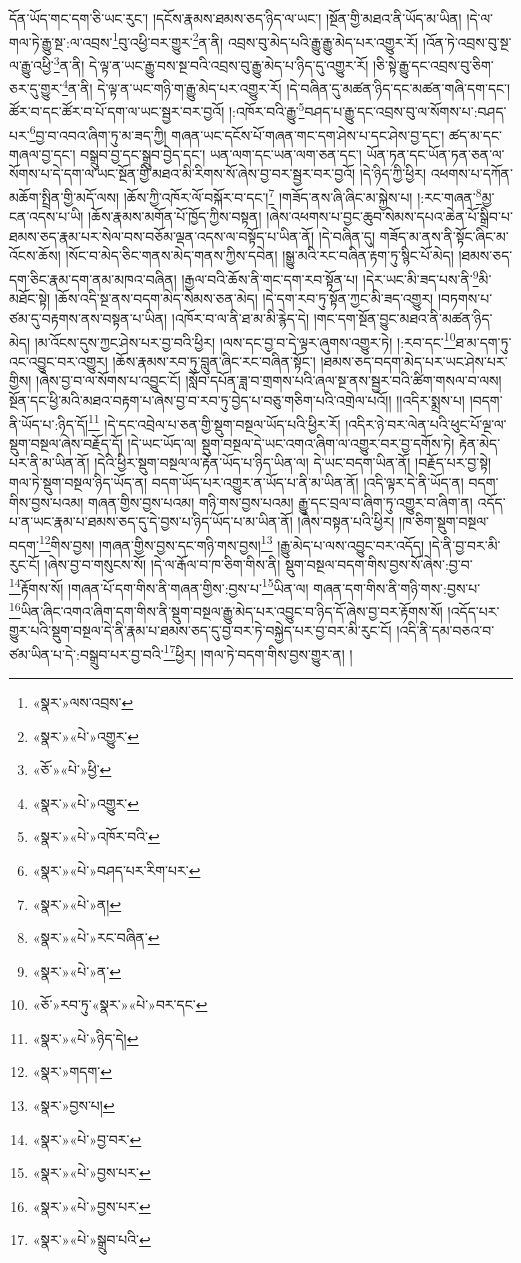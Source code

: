 དོན་ཡོད་གང་དག་ཅི་ཡང་རུང་། །དངོས་རྣམས་ཐམས་ཅད་ཉིད་ལ་ཡང་། །སྔོན་གྱི་མཐའ་ནི་ཡོད་མ་ཡིན། །དེ་ལ་གལ་ཏེ་རྒྱུ་སྔ་:ལ་འབྲས་\footnote{«སྣར་»ལས་འབྲས་}བུ་འཕྱི་བར་གྱུར་\footnote{«སྣར་»«པེ་»འགྱུར་}ན་ནི། འབྲས་བུ་མེད་པའི་རྒྱུ་རྒྱུ་མེད་པར་འགྱུར་རོ། །འོན་ཏེ་འབྲས་བུ་སྔ་ལ་རྒྱུ་འཕྱི་\footnote{«ཅོ་»«པེ་»ཕྱི་}ན་ནི། དེ་ལྟ་ན་ཡང་རྒྱུ་བས་སྔ་བའི་འབྲས་བུ་རྒྱུ་མེད་པ་ཉིད་དུ་འགྱུར་རོ། །ཅི་སྟེ་རྒྱུ་དང་འབྲས་བུ་ཅིག་ཅར་དུ་གྱུར་\footnote{«སྣར་»«པེ་»འགྱུར་}ན་ནི། དེ་ལྟ་ན་ཡང་གཉི་ག་རྒྱུ་མེད་པར་འགྱུར་རོ། །དེ་བཞིན་དུ་མཚན་ཉིད་དང་མཚན་གཞི་དག་དང་། ཚོར་བ་དང་ཚོར་བ་པོ་དག་ལ་ཡང་སྦྱར་བར་བྱའོ། །:འཁོར་བའི་རྒྱུ་\footnote{«སྣར་»«པེ་»འཁོར་བའི་}བཤད་པ་རྒྱུ་དང་འབྲས་བུ་ལ་སོགས་པ་:བཤད་པར་\footnote{«སྣར་»«པེ་»བཤད་པར་རིག་པར་}བྱ་བ་འབའ་ཞིག་ཏུ་མ་ཟད་ཀྱི། གཞན་ཡང་དངོས་པོ་གཞན་གང་དག་ཤེས་པ་དང་ཤེས་བྱ་དང་། ཚད་མ་དང་གཞལ་བྱ་དང་། བསྒྲུབ་བྱ་དང་སྒྲུབ་བྱེད་དང་། ཡན་ལག་དང་ཡན་ལག་ཅན་དང་། ཡོན་ཏན་དང་ཡོན་ཏན་ཅན་ལ་སོགས་པ་དེ་དག་ལ་ཡང་སྔོན་གྱི་མཐའ་མི་རིགས་སོ་ཞེས་བྱ་བར་སྦྱར་བར་བྱའོ། །དེ་ཉིད་ཀྱི་ཕྱིར། འཕགས་པ་དཀོན་མཆོག་སྤྲིན་གྱི་མདོ་ལས། །ཆོས་ཀྱི་འཁོར་ལོ་བསྐོར་བ་དང་།\footnote{«སྣར་»«པེ་»ན།} །གཟོད་ནས་ཞི་ཞིང་མ་སྐྱེས་པ། །:རང་གཞན་\footnote{«སྣར་»«པེ་»རང་བཞིན་}མྱ་ངན་འདས་པ་ཡི། །ཆོས་རྣམས་མགོན་པོ་ཁྱོད་ཀྱིས་བསྟན། །ཞེས་འཕགས་པ་བྱང་ཆུབ་སེམས་དཔའ་ཆེན་པོ་སྒྲིབ་པ་ཐམས་ཅད་རྣམ་པར་སེལ་བས་བཅོམ་ལྡན་འདས་ལ་བསྟོད་པ་ཡིན་ནོ། །དེ་བཞིན་དུ། གཟོད་མ་ནས་ནི་སྟོང་ཞིང་མ་འོངས་ཆོས། །སོང་བ་མེད་ཅིང་གནས་མེད་གནས་ཀྱིས་དབེན། །སྒྱུ་མའི་རང་བཞིན་རྟག་ཏུ་སྙིང་པོ་མེད། །ཐམས་ཅད་དག་ཅིང་རྣམ་དག་ནམ་མཁའ་བཞིན། །རྒྱལ་བའི་ཆོས་ནི་གང་དག་རབ་སྟོན་པ། །དེར་ཡང་མི་ཟད་པས་ནི་\footnote{«སྣར་»«པེ་»ན་}མི་མཐོང་སྟེ། །ཆོས་འདི་སྔ་ནས་བདག་མེད་སེམས་ཅན་མེད། །དེ་དག་རབ་ཏུ་སྟོན་ཀྱང་མི་ཟད་འགྱུར། །བཏགས་པ་ཙམ་དུ་བརྟགས་ནས་བསྟན་པ་ཡིན། །འཁོར་བ་ལ་ནི་ཐ་མ་མི་རྙེད་དེ། །གང་དག་སྔོན་བྱུང་མཐའ་ནི་མཚན་ཉིད་མེད། །མ་འོངས་དུས་ཀྱང་ཤེས་པར་བྱ་བའི་ཕྱིར། །ལས་དང་བྱ་བ་དེ་ལྟར་ཞུགས་འགྱུར་ཏེ། །:རབ་དང་\footnote{«ཅོ་»རབ་ཏུ་«སྣར་»«པེ་»བར་དང་}ཐ་མ་དག་ཏུ་འང་འབྱུང་བར་འགྱུར། །ཆོས་རྣམས་རབ་ཏུ་བླུན་ཞིང་རང་བཞིན་སྟོང་། །ཐམས་ཅད་བདག་མེད་པར་ཡང་ཤེས་པར་གྱིས། །ཞེས་བྱ་བ་ལ་སོགས་པ་འབྱུང་ངོ། །སློབ་དཔོན་ཟླ་བ་གྲགས་པའི་ཞལ་སྔ་ནས་སྦྱར་བའི་ཚིག་གསལ་བ་ལས། སྔོན་དང་ཕྱི་མའི་མཐའ་བརྟག་པ་ཞེས་བྱ་བ་རབ་ཏུ་བྱེད་པ་བཅུ་གཅིག་པའི་འགྲེལ་པའོ།། །།འདིར་སྨྲས་པ། །བདག་ནི་ཡོད་པ་:ཉིད་དོ།\footnote{«སྣར་»«པེ་»ཉིད་དེ།} །དེ་དང་འབྲེལ་པ་ཅན་གྱི་སྡུག་བསྔལ་ཡོད་པའི་ཕྱིར་རོ། །འདིར་ཉེ་བར་ལེན་པའི་ཕུང་པོ་ལྔ་ལ་སྡུག་བསྔལ་ཞེས་བརྗོད་དོ། །དེ་ཡང་ཡོད་ལ། སྡུག་བསྔལ་དེ་ཡང་འགའ་ཞིག་ལ་འགྱུར་བར་བྱ་དགོས་ཏེ། རྟེན་མེད་པར་ནི་མ་ཡིན་ནོ། །དེའི་ཕྱིར་སྡུག་བསྔལ་ལ་རྟེན་ཡོད་པ་ཉིད་ཡིན་ལ། དེ་ཡང་བདག་ཡིན་ནོ། །བརྗོད་པར་བྱ་སྟེ། གལ་ཏེ་སྡུག་བསྔལ་ཉིད་ཡོད་ན། བདག་ཡོད་པར་འགྱུར་ན་ཡོད་པ་ནི་མ་ཡིན་ནོ། །འདི་ལྟར་དེ་ནི་ཡོད་ན། བདག་གིས་བྱས་པའམ། གཞན་གྱིས་བྱས་པའམ། གཉི་གས་བྱས་པའམ། རྒྱུ་དང་བྲལ་བ་ཞིག་ཏུ་འགྱུར་བ་ཞིག་ན། འདོད་པ་ན་ཡང་རྣམ་པ་ཐམས་ཅད་དུ་དེ་བྱས་པ་ཉིད་ཡོད་པ་མ་ཡིན་ནོ། །ཞེས་བསྟན་པའི་ཕྱིར། །ཁ་ཅིག་སྡུག་བསྔལ་བདག་\footnote{«སྣར་»གདག་}གིས་བྱས། །གཞན་གྱིས་བྱས་དང་གཉི་གས་བྱས།\footnote{«སྣར་»བྱས་པ།} །རྒྱུ་མེད་པ་ལས་འབྱུང་བར་འདོད། །དེ་ནི་བྱ་བར་མི་རུང་ངོ། །ཞེས་བྱ་བ་གསུངས་སོ། །དེ་ལ་རྒོལ་བ་ཁ་ཅིག་གིས་ནི། སྡུག་བསྔལ་བདག་གིས་བྱས་སོ་ཞེས་:བྱ་བ་\footnote{«སྣར་»«པེ་»བྱ་བར་}རྟོགས་སོ། །གཞན་པོ་དག་གིས་ནི་གཞན་གྱིས་:བྱས་པ་\footnote{«སྣར་»«པེ་»བྱས་པར་}ཡིན་ལ། གཞན་དག་གིས་ནི་གཉི་གས་:བྱས་པ་\footnote{«སྣར་»«པེ་»བྱས་པར་}ཡིན་ཞིང་འགའ་ཞིག་དག་གིས་ནི་སྡུག་བསྔལ་རྒྱུ་མེད་པར་འབྱུང་བ་ཉིད་དོ་ཞེས་བྱ་བར་རྟོགས་སོ། །འདོད་པར་གྱུར་པའི་སྡུག་བསྔལ་དེ་ནི་རྣམ་པ་ཐམས་ཅད་དུ་བྱ་བར་ཏེ་བསྐྱེད་པར་བྱ་བར་མི་རུང་ངོ། །འདི་ནི་དམ་བཅའ་བ་ཙམ་ཡིན་པ་དེ་:བསྒྲུབ་པར་བྱ་བའི་\footnote{«སྣར་»«པེ་»སྒྲུབ་པའི་}ཕྱིར། །གལ་ཏེ་བདག་གིས་བྱས་གྱུར་ན། །
